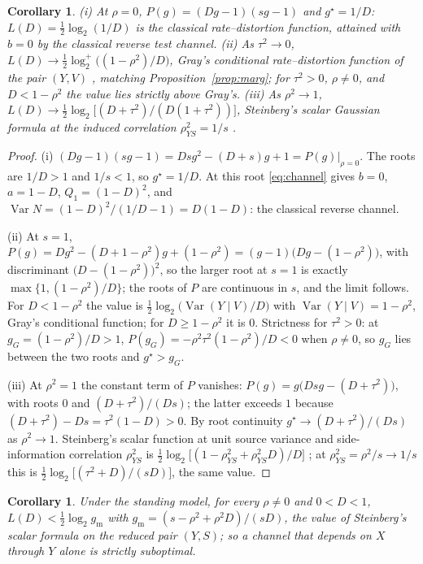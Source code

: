 \documentclass[11pt,onecolumn]{IEEEtran}
\newtheorem{corollary}[theorem]{Corollary}
\begin{document}
\begin{corollary}\label{cor:anchors}
(i) At $\rho=0$, $P(g)=(Dg-1)(sg-1)$ and $g^\star=1/D$:
$L(D)=\tfrac12\log_2(1/D)$ is the classical rate--distortion function,
attained with $b=0$ by the classical reverse test channel.
(ii) As $\tau^2\to0$,
$L(D)\to\tfrac12\log_2^{+}\bigl((1-\rho^2)/D\bigr)$, Gray's
conditional rate--distortion function of the pair $(Y,V)$
\cite{gray1973}, matching Proposition~\ref{prop:marg}; for $\tau^2>0$,
$\rho\ne0$, and $D<1-\rho^2$ the value lies strictly above Gray's.
(iii) As $\rho^2\to1$,
$L(D)\to\tfrac12\log_2\bigl[(D+\tau^2)/(D(1+\tau^2))\bigr]$,
Steinberg's scalar Gaussian formula at the induced correlation
$\rho_{YS}^2=1/s$ \cite{steinberg2009}.
\end{corollary}

\begin{proof}
(i) $(Dg-1)(sg-1)=Dsg^2-(D+s)g+1=P(g)\big|_{\rho=0}$. The roots are
$1/D>1$ and $1/s<1$, so $g^\star=1/D$. At this root \eqref{eq:channel}
gives $b=0$, $a=1-D$, $Q_1=(1-D)^2$, and
$\operatorname{Var}N=(1-D)^2/(1/D-1)=D(1-D)$: the classical reverse
channel.

(ii) At $s=1$,
$P(g)=Dg^2-(D+1-\rho^2)g+(1-\rho^2)=(g-1)\bigl(Dg-(1-\rho^2)\bigr)$,
with discriminant $\bigl(D-(1-\rho^2)\bigr)^2$, so the larger root at
$s=1$ is exactly $\max\{1,(1-\rho^2)/D\}$; the roots of $P$ are
continuous in $s$, and the limit follows. For $D<1-\rho^2$ the value
is $\tfrac12\log_2\bigl(\operatorname{Var}(Y\mid V)/D\bigr)$ with
$\operatorname{Var}(Y\mid V)=1-\rho^2$, Gray's conditional function;
for $D\ge1-\rho^2$ it is $0$. Strictness for $\tau^2>0$: at
$g_G=(1-\rho^2)/D>1$,
$P(g_G)=-\rho^2\tau^2(1-\rho^2)/D<0$ when $\rho\ne0$, so $g_G$ lies
between the two roots and $g^\star>g_G$.

(iii) At $\rho^2=1$ the constant term of $P$ vanishes:
$P(g)=g\bigl(Dsg-(D+\tau^2)\bigr)$, with roots $0$ and
$(D+\tau^2)/(Ds)$; the latter exceeds $1$ because
$(D+\tau^2)-Ds=\tau^2(1-D)>0$. By root continuity
$g^\star\to(D+\tau^2)/(Ds)$ as $\rho^2\to1$. Steinberg's scalar
function at unit source variance and side-information correlation
$\rho_{YS}^2$ is
$\tfrac12\log_2\bigl[(1-\rho_{YS}^2+\rho_{YS}^2D)/D\bigr]$
\cite{steinberg2009}; at $\rho_{YS}^2=\rho^2/s\to1/s$
this is $\tfrac12\log_2\bigl[(\tau^2+D)/(sD)\bigr]$, the same value.
\end{proof}

\begin{corollary}\label{cor:margstrict}
Under the standing model, for every $\rho\ne0$ and $0<D<1$,
$L(D)<\tfrac12\log_2 g_{\mathrm m}$ with $g_{\mathrm m}=(s-\rho^2+\rho^2D)/(sD)$, the value
of Steinberg's scalar formula \cite{steinberg2009} on the reduced pair
$(Y,S)$; so a channel that depends on $X$ through $Y$ alone is strictly
suboptimal.
\end{corollary}
\end{document}
